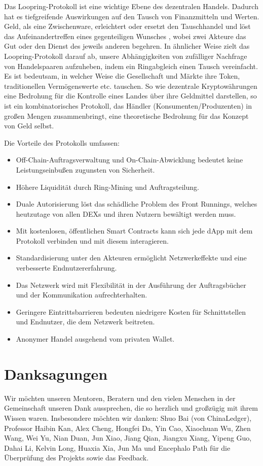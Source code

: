 \documentclass[UTF8,nofonts]{article}
\begin{document}
\begin{multicols}{2}
Das Loopring-Protokoll ist eine wichtige Ebene des dezentralen Handels. Dadurch hat es tiefgreifende Auswirkungen auf den Tausch von Finanzmitteln und Werten. Geld, als eine Zwischenware, erleichtert oder ersetzt den Tauschhandel und löst das Aufeinandertreffen eines gegenteiligen Wunsches \cite{unenumerated2006}, wobei zwei Akteure das Gut oder den Dienst des jeweils anderen begehren. In ähnlicher Weise zielt das Loopring-Protokoll darauf ab, unsere Abhängigkeiten von zufälliger Nachfrage von Handelspaaren aufzuheben, indem ein Ringabgleich einen Tausch vereinfacht. Es ist bedeutsam, in welcher Weise die Gesellschaft und Märkte ihre Token, traditionellen Vermögenswerte etc. tauschen. So wie dezentrale Kryptowährungen eine Bedrohung für die Kontrolle eines Landes über ihre Geldmittel darstellen, so ist ein kombinatorisches Protokoll, das Händler (Konsumenten/Produzenten) in großen Mengen zusammenbringt, eine theoretische Bedrohung für das Konzept von Geld selbst.

Die Vorteile des Protokolls umfassen:

\begin{itemize}
	\item Off-Chain-Auftragsverwaltung und On-Chain-Abwicklung bedeutet keine Leistungseinbußen zugunsten von Sicherheit.
	\item Höhere Liquidität durch Ring-Mining und Auftragsteilung.
	\item Duale Autorisierung löst das schädliche Problem des Front Runnings, welches heutzutage von allen DEXs und ihren Nutzern bewältigt werden muss.
	\item Mit kostenlosen, öffentlichen Smart Contracts kann sich jede dApp mit dem Protokoll verbinden und mit diesem interagieren.
	\item Standardisierung unter den Akteuren ermöglicht Netzwerkeffekte und eine verbesserte Endnutzererfahrung.
	\item Das Netzwerk wird mit Flexibilität in der Ausführung der Auftragsbücher und der Kommunikation aufrechterhalten.
	\item Geringere Eintrittsbarrieren bedeuten niedrigere Kosten für Schnittstellen und Endnutzer, die dem Netzwerk beitreten.
	\item Anonymer Handel ausgehend vom privaten Wallet.
\end{itemize}

\section{Danksagungen}
Wir möchten unseren Mentoren, Beratern und den vielen Menschen in der Gemeinschaft unseren Dank aussprechen, die so herzlich und großzügig mit ihrem Wissen waren. Insbesondere möchten wir danken: Shuo Bai (von ChinaLedger), Professor Haibin Kan, Alex Cheng, Hongfei Da, Yin Cao, Xiaochuan Wu, Zhen Wang, Wei Yu, Nian Duan, Jun Xiao, Jiang Qian, Jiangxu Xiang, Yipeng Guo, Dahai Li, Kelvin Long, Huaxia Xia, Jun Ma und Encephalo Path für die Überprüfung des Projekts sowie das Feedback.






\end{multicols}
\end{document}
